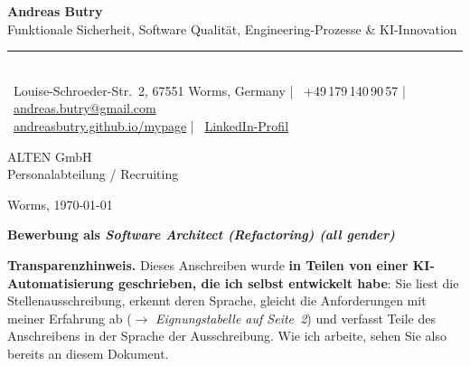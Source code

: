 \documentclass[10pt,a4paper]{moderncv}
\begin{document}
{\Huge\bfseries\color{accent}Andreas Butry}\\[1pt]
{\small\color{light}Funktionale Sicherheit, Software Qualität, Engineering-Prozesse \& KI-Innovation}\\[5pt]
{\color{accent}\rule{\linewidth}{1pt}}\\[4pt]
{\small\color{ink}%
\faLocationDot~Louise-Schroeder-Str.\ 2, 67551 Worms, Germany \;\textcolor{accent}{|}\;
\faPhone~+49\,179\,140\,90\,57 \;\textcolor{accent}{|}\;
\faEnvelope~\href{mailto:andreas.butry@gmail.com}{andreas.butry@gmail.com}\\[3pt]
\faGlobe~\href{https://andreasbutry.github.io/mypage/}{andreasbutry.github.io/mypage} \;\textcolor{accent}{|}\;
\faLinkedin~\href{https://www.linkedin.com/in/andreas-butry-23641530a}{LinkedIn-Profil}}

\bigskip

\begin{minipage}[t]{0.62\linewidth}
  ALTEN GmbH\\
  Personalabteilung / Recruiting
\end{minipage}\hfill
\begin{minipage}[t]{0.33\linewidth}
  \raggedleft Worms, \today
\end{minipage}

\bigskip

{\bfseries Bewerbung als \emph{Software Architect (Refactoring) (all gender)}}

\medskip

\begin{tcolorbox}[colback=notebg,colframe=accent,boxrule=0.8pt,arc=3pt,
                  left=8pt,right=8pt,top=5pt,bottom=5pt]
{\small\color{ink}\faRobot\enspace\textbf{Transparenzhinweis.}
Dieses Anschreiben wurde \textbf{in Teilen von einer KI-Automatisierung
geschrieben, die ich selbst entwickelt habe}: Sie liest die
Stellenausschreibung, erkennt deren Sprache, gleicht die Anforderungen mit
meiner Erfahrung ab ($\rightarrow$ \emph{Eignungstabelle auf Seite~2}) und
verfasst Teile des Anschreibens in der Sprache der Ausschreibung. Wie ich arbeite, sehen Sie
also bereits an diesem Dokument.}
\end{tcolorbox}

\medskip
\end{document}
